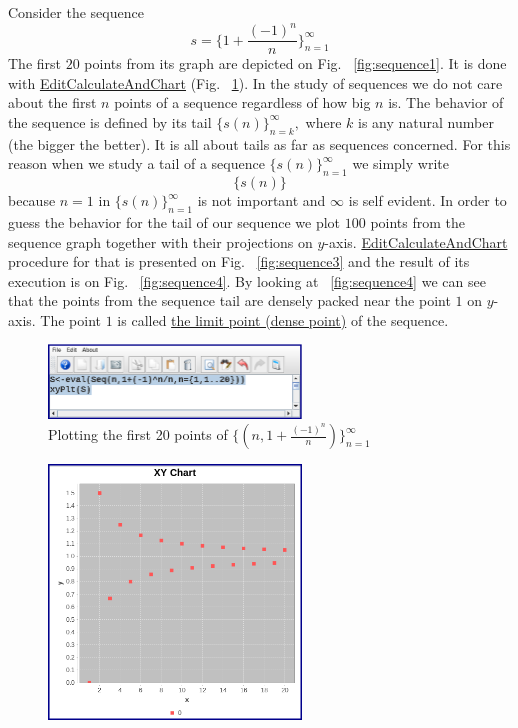 \documentclass[color=black,11pt]{elegantpaper}
\begin{document}
\begin{example}
\label{ex:sequence1}
Consider the sequence
$$
s=\{1+\frac{(-1)^n}{n}\}_{n=1}^{\infty}
$$
The first $20$ points from its graph are depicted on Fig. ~\ref{fig:sequence1}. It is done with \href{https://github.com/mathhobbit/EditCalculateAndChart/releases}{EditCalculateAndChart} (Fig. ~\ref{fig:sequence2}). In the study of sequences we do not care about the first $n$ points of a sequence regardless of how big $n$ is. The behavior of the sequence is defined by its tail $\{s(n)\}_{n=k}^{\infty},$ where $k$ is any natural number (the bigger the better).
 It is all about tails as far as sequences concerned. For this reason when  we study a tail of a sequence  $\{s(n)\}_{n=1}^{\infty}$ we simply write
$$
  \{s(n)\}
$$
because $n=1$ in $\{s(n)\}_{n=1}^{\infty}$ is not important and $\infty$  is self evident.
 In order to guess the behavior for the tail of our sequence we plot $100$ points from the sequence graph together with their projections on $y$-axis.  \href{https://github.com/mathhobbit/EditCalculateAndChart/releases}{EditCalculateAndChart} procedure for that is presented on Fig. ~\ref{fig:sequence3} and the result of its execution is on Fig. ~\ref{fig:sequence4}. By looking at ~\ref{fig:sequence4} we can see that the points from the sequence tail are densely packed near the point $1$ on $y$-axis. The point $1$ is called \href{https://en.wikipedia.org/wiki/Dense_set}{the limit point (dense point)} of the sequence.
\begin{figure}[htbp]
  \centering
  \includegraphics[width=0.6\textwidth]{image/sequence2.eps}
  \caption{Plotting the first 20 points of $\{(n,1+\frac{(-1)^n}{n})\}_{n=1}^{\infty}$}
  \label{fig:sequence2}
\end{figure}
\begin{figure}[htbp]
  \centering
  \includegraphics[width=0.6\textwidth]{image/sequence1.png}

\end{figure}
\end{example}
\end{document}
